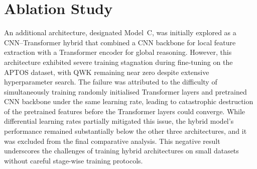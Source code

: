 \section{Ablation Study}
\label{sec:model_c}

An additional architecture, designated Model~C, was initially explored as a CNN--Transformer hybrid that combined a CNN backbone for local feature extraction with a Transformer encoder for global reasoning. However, this architecture exhibited severe training stagnation during fine-tuning on the APTOS dataset, with QWK remaining near zero despite extensive hyperparameter search. The failure was attributed to the difficulty of simultaneously training randomly initialised Transformer layers and pretrained CNN backbone under the same learning rate, leading to catastrophic destruction of the pretrained features before the Transformer layers could converge. While differential learning rates partially mitigated this issue, the hybrid model's performance remained substantially below the other three architectures, and it was excluded from the final comparative analysis. This negative result underscores the challenges of training hybrid architectures on small datasets without careful stage-wise training protocols.
